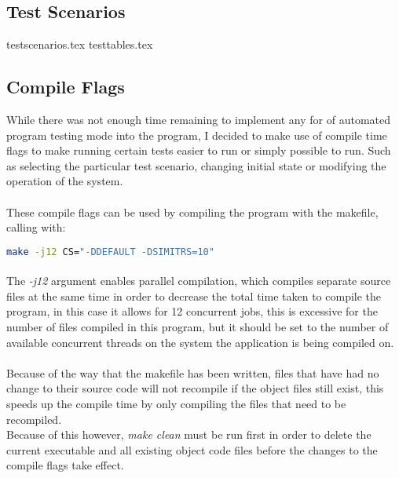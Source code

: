 \subsection{Test Scenarios}
{testscenarios.tex}
{testtables.tex}
\pagebreak
\subsection{Compile Flags}
While there was not enough time remaining to implement any for of automated program testing mode into the program, I decided to make use of compile time flags to make running certain tests easier to run or simply possible to run. Such as selecting the particular test scenario, changing initial state or modifying the operation of the system.

\paragraph{}
These compile flags can be used by compiling the program with the makefile, calling with:

\begin{lstlisting}[language=bash]
  make -j12 CS="-DDEFAULT -DSIMITRS=10"
\end{lstlisting}

\paragraph{}
The \textit{-j12} argument enables parallel compilation, which compiles separate source files at the same time in order to decrease the total time taken to compile the program, in this case it allows for 12 concurrent jobs, this is excessive for the number of files compiled in this program, but it should be set to the number of available concurrent threads on the system the application is being compiled on.

\paragraph{}
Because of the way that the makefile has been written, files that have had no change to their source code will not recompile if the object files still exist, this speeds up the compile time by only compiling the files that need to be recompiled. \\
Because of this however, \textit{make clean} must be run first in order to delete the current executable and all existing object code files before the changes to the compile flags take effect.


